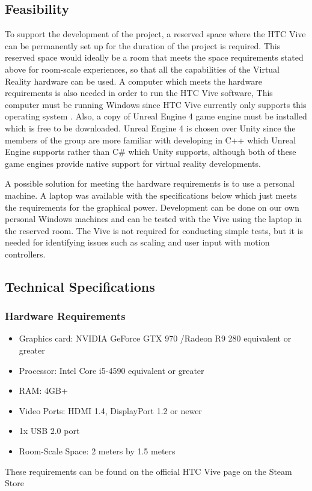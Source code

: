 \subsection{Feasibility}
To support the development of the project, a reserved space where the HTC Vive can be permanently set up for the duration of the project is required. This reserved space would ideally be a room that meets the space requirements stated above for room-scale experiences, so that all the capabilities of the Virtual Reality hardware can be used. A computer which meets the hardware requirements is also needed in order to run the HTC Vive software, This computer must be running Windows since HTC Vive currently only supports this operating system \cite{vivenolinux}. Also, a copy of Unreal Engine 4 game engine must be installed which is free to be downloaded. Unreal Engine 4 is chosen over Unity since the members of the group are more familiar with developing in C++ which Unreal Engine supports rather than C\# which Unity supports, although both of these game engines provide native support for virtual reality developments.
\newline
\par
A possible solution for meeting the hardware requirements is to use a personal machine. A laptop was available with the specifications below which just meets the requirements for the graphical power. Development can be done on our own personal Windows machines and can be tested with the Vive using the laptop in the reserved room. The Vive is not required for conducting simple tests, but it is needed for identifying issues such as scaling and user input with motion controllers.

\subsection{Technical Specifications}

\subsubsection{Hardware Requirements}
\begin{itemize}
	\item Graphics card: NVIDIA GeForce GTX 970 /Radeon R9 280 equivalent or greater
	\item Processor: Intel Core i5-4590 equivalent or greater
	\item RAM: 4GB+
	\item Video Ports: HDMI 1.4, DisplayPort 1.2 or newer 
	\item 1x USB 2.0 port
	\item Room-Scale Space: 2 meters by 1.5 meters
\end{itemize}

These requirements can be found on the official HTC Vive page on the Steam Store \cite{vivehardware}
